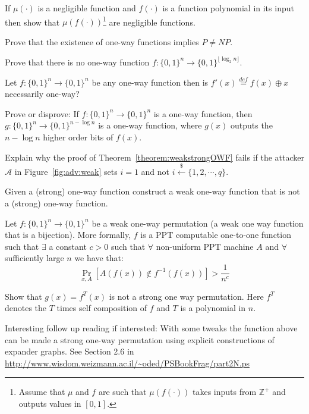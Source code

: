 \documentclass[12pt]{tufte-book}
\begin{document}
\begin{exercise}
\label{ex:product} If $\mu(\cdot)$ is a negligible function and $f(\cdot)$ is a function polynomial in its input then show that $\mu(f(\cdot))$\footnote{Assume that $\mu$ and $f$ are such that $\mu(f(\cdot))$ takes inputs from $\mathbb{Z}^+$ and outputs values in $[0,1]$.} are negligible functions.
\end{exercise}

\begin{exercise}\label{ex:PNP} Prove that the existence of one-way functions implies $P \neq NP$.
\end{exercise}

\begin{exercise}
Prove that there is no one-way function $f:\{0,1\}^n\to \{0,1\}^{\lfloor \log_2 n\rfloor}$.
\end{exercise}


\begin{exercise} Let $f:\{0,1\}^n\to \{0,1\}^{n}$ be any one-way function then is $f'(x) \stackrel{def}{=} f(x)\oplus x$ necessarily one-way?
\end{exercise}

\begin{exercise}
Prove or disprove: If $f: \{0,1\}^n\rightarrow \{0,1\}^n$ is a one-way function, then $g: \{0,1\}^n\rightarrow \{0,1\}^{n-\log n}$ is a one-way function, where $g(x)$ outputs the $n-\log n$ higher order bits of $f(x)$.
\end{exercise}

\begin{exercise}
Explain why the proof of Theorem~\ref{theorem:weakstrongOWF} fails if the attacker $\mathcal{A}$ in Figure~\ref{fig:adv:weak} sets $i = 1$ and not $i \stackrel{\$}{\leftarrow} \{1, 2, \cdots, q\}$.
\end{exercise}

\begin{exercise}
Given a (strong) one-way function construct a weak one-way function that is not a (strong) one-way function.
\end{exercise}

\begin{exercise}
 Let $f:\{0,1\}^n\to \{0,1\}^{n}$ be a weak one-way permutation (a weak one way function that is a bijection). More formally, $f$ is a PPT computable one-to-one function such that $\exists$ a constant $c >0$ such that $\forall$ non-uniform PPT machine $A$ and $\forall$ sufficiently large $n$ we have that:
    \[\Pr_{x,A}[A(f(x)) \not\in f^{-1}(f(x))] > \frac{1}{n^c}\]

     Show that $g(x) = f^T(x)$ is not a strong one way permutation. Here $f^T$ denotes the $T$ times self composition of $f$ and $T$ is a polynomial in $n$.

     Interesting follow up reading if interested: With some tweaks the function above can be made a strong one-way permutation using explicit constructions of expander graphs. See Section 2.6 in \url{http://www.wisdom.weizmann.ac.il/~oded/PSBookFrag/part2N.ps}
\end{exercise}
\end{document}
